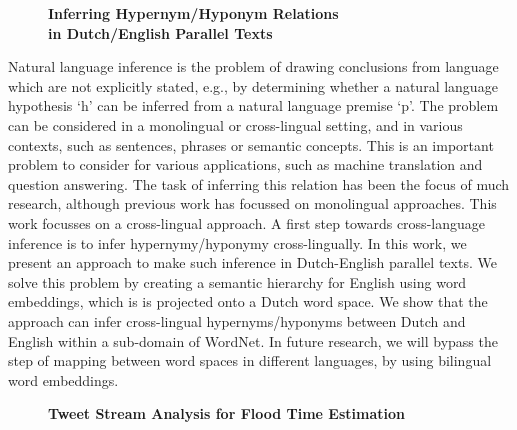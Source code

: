 \documentclass[10pt, a4paper, twopage, headinclude, footinclude, BCOR5mm]{scrartcl}
\begin{document}
{{\newpage

\begin{figure}[t!]
\centering
\large\textbf{Inferring Hypernym/Hyponym Relations \\ in Dutch/English Parallel Texts}
\vspace*{0.5cm}
\end{figure}


        \begin{table}[t!]
    \end{table}

\noindent
Natural language inference is the problem of drawing conclusions from language which are not explicitly stated, e.g., by determining whether a natural language hypothesis `h' can be inferred from a natural language premise `p'. The problem can be considered in a monolingual or cross-lingual setting, and in various contexts, such as sentences, phrases or semantic concepts. This is an important problem to consider for various applications, such as machine translation and question answering. The task of inferring this relation has been the focus of much research, although previous work has focussed on monolingual approaches. This work focusses on a cross-lingual approach. A first step towards cross-language inference is to infer hypernymy/hyponymy cross-lingually. In this work, we present an approach to make such inference in Dutch-English parallel texts.  We solve this problem by creating a semantic hierarchy for English using word embeddings, which is is projected onto a Dutch word space. We show that the approach can infer cross-lingual hypernyms/hyponyms between Dutch and English within a sub-domain of WordNet. In future research, we will bypass the step of mapping between word spaces in different languages, by using bilingual word embeddings.


\newpage

\begin{figure}[t!]
\centering
\large\textbf{Tweet Stream Analysis for Flood Time Estimation}
\vspace*{0.5cm}
\end{figure}


}}
\end{document}
